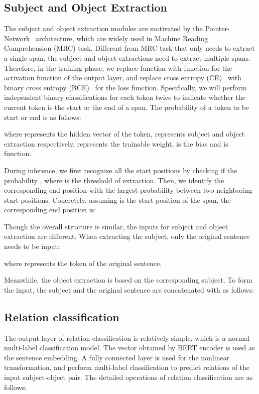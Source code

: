 \documentclass[11pt,a4paper]{article}
\begin{document}
\subsection{Subject and Object Extraction}
The subject and object extraction modules are motivated by the Pointer-Network~\cite{vinyals2015pointer} architecture, which are 
widely used in Machine Reading Comprehension (MRC) \cite{rajpurkar2016squad} task. Different from MRC task that only needs to extract a single span, the subject and object extractions need to extract multiple spans. Therefore, in the training phase, we replace  function with  function for the activation function of the output layer, and replace cross entropy (CE)~\cite{goodfellow2016deep} with binary cross entropy (BCE)~\cite{luc2016semantic} for the loss function. Specifically, we will perform independent binary classifications for each token twice to indicate whether the current token is the start or the end of a span. The probability of a token to be start or end is as follows:

where  represents the hidden vector of the  token,  represents subject and object extraction respectively,  represents the trainable weight,  is the bias and  is  function.

During inference, we first recognize all the start positions by checking if the probability , where  is the threshold of extraction. Then, we identify the corresponding end position with the largest probability  between two neighboring start positions. Concretely, assuming  is the start position of the  span, the corresponding end position is:



Though the overall structure is similar, the inputs for subject and object extraction are different. When extracting the subject, only the original sentence needs to be input:

where  represents the  token of the original sentence.

Meanwhile, the object extraction is based on the corresponding subject. To form the input, the subject  and the original sentence  are concatenated with  as follows:


\subsection{Relation classification}
The output layer of relation classification is relatively simple, which is a normal multi-label classification model. The  vector obtained by BERT encoder is used as the sentence embedding. A fully connected layer is used for the nonlinear transformation, and perform multi-label classification to predict relations of the input subject-object pair. The detailed operations of relation classification are as follows:
\end{document}
